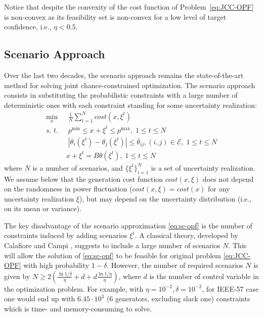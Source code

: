 Notice that despite the convexity of the cost function of Problem~\eqref{eq:JCC-OPF} is non-convex as its feasibility set is non-convex for a low level of target confidence, i.e., $\eta < 0.5$.

\subsection{Scenario Approach}

Over the last two decades, the scenario approach \cite{nemirovski2006scenario,calafiore2006scenario} 
remains the state-of-the-art method for solving joint chance-constrained optimization. The scenario approach consists in substituting the probabilistic constraints with a large number of deterministic ones with each constraint standing for some uncertainty realization:
\begin{align}\label{eq:sc-opf}
  \min_x & \; \frac{1}{N} \sum_{t=1}^N \textit{cost}(x,\xi^t)\\
  \textit{s. t. } & \; p^{\min} \le x+\xi^t \le p^{\max}, \; 1\le t \le N\nonumber\\
  & \; |\theta_i(\xi^t) - \theta_j(\xi^t)| \le {\bar \theta}_{ij}, (i, j)\in \mathcal{E}, \; 1\le t \le N\nonumber\\
  & x+\xi^t = B \theta(\xi^t), \; 1\le t \le N\nonumber
\end{align}
where $N$ is a number of scenarios, and $\{\xi^t\}_{i=1}^N$ is a set of uncertainty realization. We assume below that the generation cost function $\textit{cost}(x, \xi)$ does not depend on the randomness in power fluctuation ($\textit{cost}(x, \xi) = \textit{cost}(x)$ for any uncertainty realization $\xi$), but may depend on the uncertainty distribution (i.e., on its mean or variance). %

The key disadvantage of the scenario approximation \eqref{eq:sc-opf} is the number of constraints induced by adding scenarios $\xi^t$. A classical theory, developed by Calafiore and Campi \cite{calafiore2006scenario}, suggests to include a large number of scenarios $N$. This will allow the solution of \eqref{eq:sc-opf} to be feasible for original problem \eqref{eq:JCC-OPF} with high probability $1 - \delta$. However, the number of required scenarios $N$ is given by $N \geq 2 \left( \frac{\ln{1/\delta}}{\eta} + d + d\frac{\ln{1/\eta}}{\eta} \right)$, where $d$ is the number of control variable in the optimization problem. For example, with $\eta = 10^{-2}, \delta = 10^{-2}$, for  IEEE-57 case one would end up with $6.45 \cdot 10^3$ (6 generators, excluding slack one) constraints which is time- and memory-consuming to solve.

